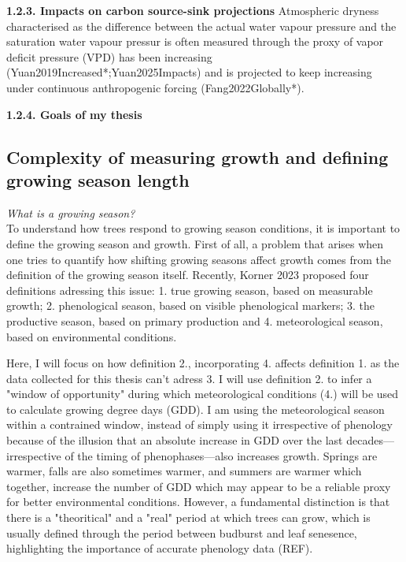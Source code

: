 \documentclass{article}
\begin{document}
\textbf{1.2.3. Impacts on carbon source-sink projections} 
Atmospheric dryness characterised as the difference between the actual water vapour pressure and the saturation water vapour pressur is often measured through the proxy of vapor deficit pressure (VPD) has been increasing (Yuan2019Increased*;Yuan2025Impacts) and is projected to keep increasing under continuous anthropogenic forcing (Fang2022Globally*).

\textbf{1.2.4. Goals of my thesis} 

\subsection{Complexity of measuring growth and defining growing season length}
\textit{What is a growing season?} \\
To understand how trees respond to growing season conditions, it is important to define the growing season and growth.
First of all, a problem that arises when one tries to quantify how shifting growing seasons affect growth comes from the definition of the growing season itself. Recently, Korner 2023 proposed four definitions adressing this issue: 1. true growing season, based on measurable growth; 2. phenological season, based on visible phenological markers; 3. the productive season, based on primary production and 4. meteorological season, based on environmental conditions.

Here, I will focus on how definition 2., incorporating 4. affects definition 1. as the data collected for this thesis can't adress 3. I will use definition 2. to infer a "window of opportunity" during which meteorological conditions (4.) will be used to calculate growing degree days (GDD). I am using the meteorological season within a contrained window, instead of simply using it irrespective of phenology because of the illusion that an absolute increase in GDD over the last decades---irrespective of the timing of phenophases---also increases growth. Springs are warmer, falls are also sometimes warmer, and summers are warmer which together, increase the number of GDD which may appear to be a reliable proxy for better environmental conditions. However, a fundamental distinction is that there is a "theoritical" and a "real" period at which trees can grow, which is usually defined through the period between budburst and leaf senesence, highlighting the importance of accurate phenology data (REF).
\end{document}
